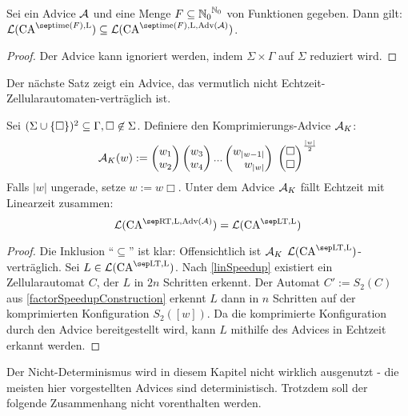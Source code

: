 \begin{lemma}
    \label{lemmaIgnoriereAdvice}
    Sei ein Advice $\mathcal{A}$ und eine Menge
    $F \subseteq {\mathbb{N}_0}^{\mathbb{N}_0}$ von Funktionen gegeben.
    Dann gilt: $\mathcal{L}(\CAM{ \mathrm{time}(F), \CALeft }) \subseteq  \mathcal{L}(\CAM{ \mathrm{time}(F), \CALeft, \orakel(\advA)})$.
\end{lemma}
\begin{proof}
    Der Advice kann ignoriert werden, indem $\Sigma \times \Gamma$ auf $\Sigma$ reduziert wird.
\end{proof}

Der nächste Satz zeigt ein Advice, das vermutlich nicht Echtzeit-Zellularautomaten-verträglich ist.

\begin{satz}
    Sei $(\Sigma \cup \{ {\Box} \}) ^2 \subseteq \Gamma, \Box \not\in \Sigma$.
    Definiere den Komprimierungs-Advice $\mathcal{A}_K$:
    \[
        \advA_K(w) := 
                  \Spvek{w_1; w_2} \Spvek{w_3; w_4} ... \Spvek{w_{|w-1|}; w_{|w|}}
                        \; \Spvek{\Box; \Box}^\frac{|w|}{2}
    \]
    Falls $|w|$ ungerade, setze $w := w\Box$.
    Unter dem Advice $\mathcal{A}_K$ fällt Echtzeit mit Linearzeit zusammen:
    \[
        \CAL{\CART, \CALeft, \orakel({\advA})} = \CAL{\CALT, \CALeft}
    \]
\end{satz}
\begin{proof}
    Die Inklusion \enquote{$\subseteq$} ist klar: Offensichtlich ist $\mathcal{A}_K$ $\CAL{\CALT, \CALeft}$-verträglich.
    Sei $L \in \CAL{\CALT, \CALeft}$.
    Nach \cref{linSpeedup} existiert ein Zellularautomat $C$, der $L$ in $2n$ Schritten erkennt.
    Der Automat $C' := S_2(C)$ aus \cref{factorSpeedupConstruction}
    erkennt $L$ dann in $n$ Schritten auf der komprimierten Konfiguration $S_2([w])$.
    Da die komprimierte Konfiguration durch den Advice bereitgestellt wird, kann $L$ mithilfe des Advices in Echtzeit erkannt werden.
\end{proof}

Der Nicht-Determinismus wird in diesem Kapitel nicht wirklich ausgenutzt - die meisten hier vorgestellten Advices sind deterministisch.
Trotzdem soll der folgende Zusammenhang nicht vorenthalten werden.

